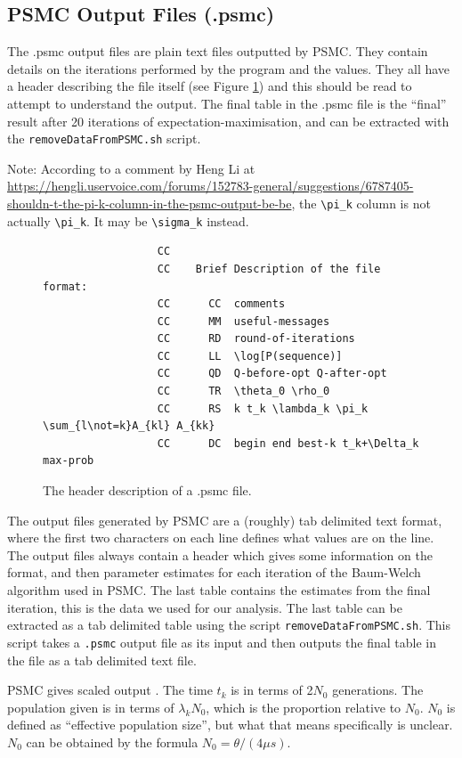 \documentclass[11pt,a4paper]{article}
\begin{document}
\subsection{PSMC Output Files (.psmc)}
The .psmc output files are plain text files outputted by PSMC. They contain details on the iterations performed by the program and the values. They all have a header describing the file itself (see Figure \ref{psmcHeader}) and this should be read to attempt to understand the output. The final table in the .psmc file is the ``final'' result after 20 iterations of expectation-maximisation, and can be extracted with the \verb|removeDataFromPSMC.sh| script.

Note: According to a comment by Heng Li at \url{https://hengli.uservoice.com/forums/152783-general/suggestions/6787405-shouldn-t-the-pi-k-column-in-the-psmc-output-be-be}, the \verb|\pi_k| column is not actually \verb|\pi_k|. It may be \verb|\sigma_k| instead.

	\begin{figure}[h]
		\begin{lstlisting}
                  CC
                  CC	Brief Description of the file format:
                  CC	  CC  comments
                  CC	  MM  useful-messages
                  CC	  RD  round-of-iterations
                  CC	  LL  \log[P(sequence)]
                  CC	  QD  Q-before-opt Q-after-opt
                  CC	  TR  \theta_0 \rho_0
                  CC	  RS  k t_k \lambda_k \pi_k \sum_{l\not=k}A_{kl} A_{kk}
                  CC	  DC  begin end best-k t_k+\Delta_k max-prob
		\end{lstlisting}
		\caption{The header description of a .psmc file.}\label{psmcHeader}
	\end{figure}

The output files generated by PSMC are a (roughly) tab delimited text format, where the first two characters on each line defines what values are on the line. The output files always contain a header which gives some information on the format, and then parameter estimates for each iteration of the Baum-Welch algorithm used in PSMC. The last table contains the estimates from the final iteration, this is the data we used for our analysis. The last table can be extracted as a tab delimited table using the script \verb|removeDataFromPSMC.sh|. This script takes a \verb|.psmc| output file as its input and then outputs the final table in the file as a tab delimited text file.

PSMC gives scaled output \cite{li2011inference}. The time $t_k$ is in terms of 2$N_0$ generations. The population given is in terms of $\lambda_kN_0$, which is the proportion relative to $N_0$. $N_0$ is defined as ``effective population size'', but what that means specifically is unclear. $N_0$ can be obtained by the formula $N_0=\theta/(4\mu s)$.


{}
\end{document}

